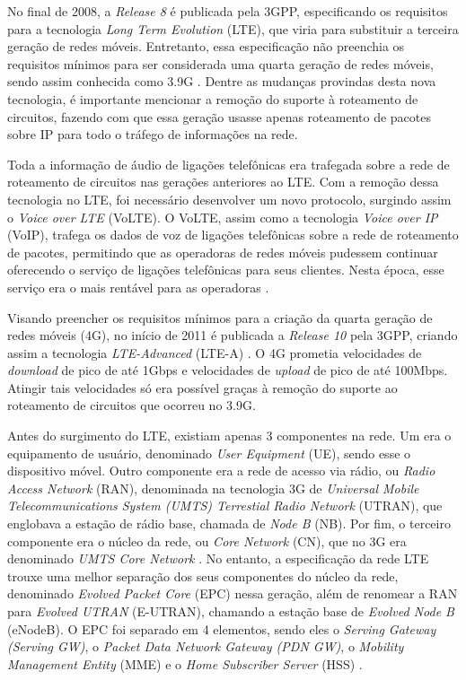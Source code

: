 No final de 2008, a \textit{Release 8} é publicada pela 3GPP, especificando os requisitos para a tecnologia \textit{Long Term Evolution} (LTE), que viria para substituir a terceira geração de redes móveis.
Entretanto, essa especificação não preenchia os requisitos mínimos para ser considerada uma quarta geração de redes móveis, sendo assim conhecida como 3.9G \cite{delperal2018}.
Dentre as mudanças provindas desta nova tecnologia, é importante mencionar a remoção do suporte à roteamento de circuitos, fazendo com que essa geração usasse apenas roteamento de pacotes sobre IP para todo o tráfego de informações na rede.

Toda a informação de áudio de ligações telefônicas era trafegada sobre a rede de roteamento de circuitos nas gerações anteriores ao LTE.
Com a remoção dessa tecnologia no LTE, foi necessário desenvolver um novo protocolo, surgindo assim o \textit{Voice over LTE} (VoLTE).
O VoLTE, assim como a tecnologia \textit{Voice over IP} (VoIP), trafega os dados de voz de ligações telefônicas sobre a rede de roteamento de pacotes, permitindo que as operadoras de redes móveis pudessem continuar oferecendo o serviço de ligações telefônicas para seus clientes. Nesta época, esse serviço era o mais rentável para as operadoras \cite{Yi2012}. 

Visando preencher os requisitos mínimos para a criação da quarta geração de redes móveis (4G), no início de 2011 é publicada a \textit{Release 10} pela 3GPP, criando assim a tecnologia \textit{LTE-Advanced} (LTE-A) \cite{3gpp.21.201}.
O 4G prometia velocidades de \textit{download} de pico de até 1Gbps e velocidades de \textit{upload} de pico de até 100Mbps.
Atingir tais velocidades só era possível graças à remoção do suporte ao roteamento de circuitos que ocorreu no 3.9G.

Antes do surgimento do LTE, existiam apenas 3 componentes na rede. Um era o equipamento de usuário, denominado \textit{User Equipment} (UE), sendo esse o dispositivo móvel. Outro componente era a rede de acesso via rádio, ou \textit{Radio Access Network} (RAN), denominada na tecnologia 3G de \textit{Universal Mobile Telecommunications System (UMTS) Terrestial Radio Network} (UTRAN), que englobava a estação de rádio base, chamada de \textit{Node B} (NB). Por fim, o terceiro componente era o núcleo da rede, ou \textit{Core Network} (CN), que no 3G era denominado \textit{UMTS Core Network} \cite{Miah2002}.
No entanto, a especificação da rede LTE trouxe uma melhor separação dos seus componentes do núcleo da rede, denominado \textit{Evolved Packet Core} (EPC) nessa geração, além de renomear a RAN para \textit{Evolved UTRAN} (E-UTRAN), chamando a estação base de \textit{Evolved Node B} (eNodeB).
O EPC foi separado em 4 elementos, sendo eles o \textit{Serving Gateway (Serving GW)}, o \textit{Packet Data Network Gateway (PDN GW)}, o \textit{Mobility Management Entity} (MME) e o \textit{Home Subscriber Server} (HSS) \cite{3gpp.23.214}.

